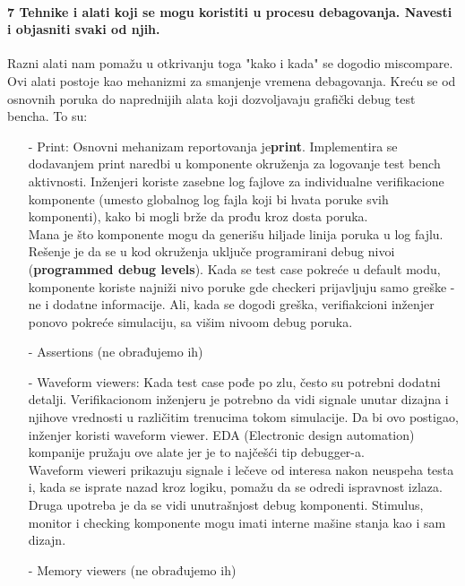 \documentclass[a4paper, 12pt]{article}
\begin{document}
\paragraph{7 Tehnike i alati koji se mogu koristiti u procesu debagovanja. Navesti i objasniti svaki od njih.}
\hfill \break
\indent Razni alati nam pomažu u otkrivanju toga "kako i kada" se dogodio miscompare. Ovi alati postoje kao mehanizmi za smanjenje vremena debagovanja. Kreću se od osnovnih poruka do naprednijih alata koji dozvoljavaju grafički debug test bencha. To su:
\begin{itemize}
\item[-] Print: 
Osnovni mehanizam reportovanja je\textbf{print}. Implementira se dodavanjem print naredbi u komponente okruženja za logovanje test bench aktivnosti. Inženjeri koriste zasebne log fajlove za individualne verifikacione komponente (umesto globalnog log fajla koji bi hvata poruke svih komponenti), kako bi mogli brže da prođu kroz dosta poruka.\\
Mana je što komponente mogu da generišu hiljade linija poruka u log fajlu. Rešenje je da se u kod okruženja uključe programirani debug nivoi (\textbf{programmed debug levels}). Kada se test case pokreće u default modu, komponente koriste najniži nivo poruke gde checkeri prijavljuju samo greške - ne i dodatne informacije. Ali, kada se dogodi greška, verifiakcioni inženjer ponovo pokreće simulaciju, sa višim nivoom debug poruka.
\item[-] Assertions (ne obrađujemo ih)
\item[-] Waveform viewers: 
Kada test case pođe po zlu, često su potrebni dodatni detalji. Verifikacionom inženjeru je potrebno da vidi signale unutar dizajna i njihove vrednosti u različitim trenucima tokom simulacije. Da bi ovo postigao, inženjer koristi waveform viewer. EDA (Electronic design automation) kompanije pružaju ove alate jer je to najčešći tip debugger-a.\\
Waveform vieweri prikazuju signale i lečeve od interesa nakon neuspeha testa i, kada se isprate nazad kroz logiku, pomažu da se odredi ispravnost  izlaza. Druga upotreba je da se vidi unutrašnjost debug komponenti. Stimulus, monitor i checking komponente mogu imati interne mašine stanja kao i sam dizajn. 
\item[-] Memory viewers (ne obrađujemo ih)
\end{itemize}
\end{document}
